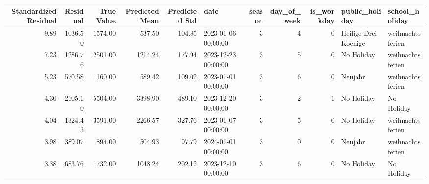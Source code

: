 \begin{tabular}{rrrrrlrrrll}
\toprule
Standardized Residual & Residual & True Value & Predicted Mean & Predicted Std & date & season & day_of_week & is_workday & public_holiday & school_holiday \\
\midrule
9.89 & 1036.50 & 1574.00 & 537.50 & 104.85 & 2023-01-06 00:00:00 & 3 & 4 & 0 & Heilige Drei Koenige & weihnachtsferien \\
7.23 & 1286.76 & 2501.00 & 1214.24 & 177.94 & 2023-12-23 00:00:00 & 3 & 5 & 0 & No Holiday & weihnachtsferien \\
5.23 & 570.58 & 1160.00 & 589.42 & 109.02 & 2023-01-01 00:00:00 & 3 & 6 & 0 & Neujahr & weihnachtsferien \\
4.30 & 2105.10 & 5504.00 & 3398.90 & 489.10 & 2023-12-20 00:00:00 & 3 & 2 & 1 & No Holiday & No Holiday \\
4.04 & 1324.43 & 3591.00 & 2266.57 & 327.76 & 2023-01-07 00:00:00 & 3 & 5 & 0 & No Holiday & weihnachtsferien \\
3.98 & 389.07 & 894.00 & 504.93 & 97.79 & 2024-01-01 00:00:00 & 3 & 0 & 0 & Neujahr & weihnachtsferien \\
3.38 & 683.76 & 1732.00 & 1048.24 & 202.12 & 2023-12-10 00:00:00 & 3 & 6 & 0 & No Holiday & No Holiday \\
\bottomrule
\end{tabular}
